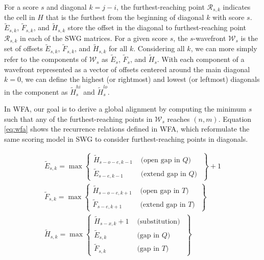 \documentclass[10pt]{article}         %
\begin{document}
For a score $s$ and diagonal $k = j - i$, the furthest-reaching point $\mathcal{R}_{s,k}$ indicates the cell in $H$ that is the furthest from the beginning of diagonal $k$ with score $s$.
$\widetilde{E}_{s, k}$, $\widetilde{F}_{s, k}$, and $\widetilde{H}_{s, k}$ store the offset in the diagonal to furthest-reaching point $\mathcal{R}_{s,k}$ in each of the SWG matrices.
For a given score $s$, the $s$-wavefront $\mathcal{W}_s$ is the set of offsets $\widetilde{E}_{s, k}$, $\widetilde{F}_{s, k}$, and $\widetilde{H}_{s, k}$ for all $k$.
Considering all $k$, we can more simply refer to the components of $\mathcal{W}_s$ as $\widetilde{E}_s$, $\widetilde{F}_s$, and $\widetilde{H}_s$.
With each component of a wavefront represented as a vector of offsets centered around the main diagonal $k = 0$, we can define the highest (or rightmost) and lowest (or leftmost) diagonals in the component as $\widetilde{H}^{hi}_s$ and $\widetilde{H}^{lo}_s$.




In WFA, our goal is to derive a global alignment by computing the minimum $s$ such that any of the furthest-reaching points in $\mathcal{W}_s$ reaches $(n, m)$.
Equation \ref{eq:wfa} shows the recurrence relations defined in WFA, which reformulate the same scoring model in SWG to consider furthest-reaching points in diagonals.

\begin{equation}
\begin{array}{lll}
\widetilde{E}_{s, k}=\max \left\{\begin{array}{ll}
\widetilde{H}_{s-o-e, k-1} & \text { (open gap in $Q$) } \\
\widetilde{E}_{s-e, k-1} & \text { (extend gap in $Q$) }
\end{array}\right\}+1 \\
\widetilde{F}_{s, k}=\max \left\{\begin{array}{ll}
\widetilde{H}_{s-o-e, k+1} & \text { (open gap in $T$) } \\
\widetilde{F}_{s-e, k+1} & \text { (extend gap in $T$) }
\end{array}\right\} \\
\widetilde{H}_{s, k}=\max \left\{\begin{array}{ll}
\widetilde{H}_{s-x, k}+1 & \text { (substitution) } \\
\widetilde{E}_{s, k} & \text { (gap in $Q$) } \\
\widetilde{F}_{s, k} & \text { (gap in $T$) }
\end{array}\right\}
\end{array}
\label{eq:wfa}
\end{equation}
\end{document}
